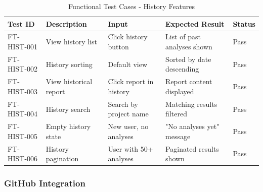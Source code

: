 \documentclass[12pt,a4paper]{article}
\begin{document}
    \begin{table}[H]
        \caption{Functional Test Cases - History Features}
        \begin{tabular}{|p{2cm}|p{4cm}|p{3cm}|p{3cm}|p{1.5cm}|}
            \hline
            \textbf{Test ID} & \textbf{Description} & \textbf{Input} & \textbf{Expected Result} & \textbf{Status} \\
            \hline
            FT-HIST-001 & View history list & Click history button & List of past analyses shown & Pass \\
            \hline
            FT-HIST-002 & History sorting & Default view & Sorted by date descending & Pass \\
            \hline
            FT-HIST-003 & View historical report & Click report in history & Report content displayed & Pass \\
            \hline
            FT-HIST-004 & History search & Search by project name & Matching results filtered & Pass \\
            \hline
            FT-HIST-005 & Empty history state & New user, no analyses & "No analyses yet" message & Pass \\
            \hline
            FT-HIST-006 & History pagination & User with 50+ analyses & Paginated results shown & Pass \\
            \hline
        \end{tabular}
    \end{table}

    \subsubsection{GitHub Integration}
\end{document}
